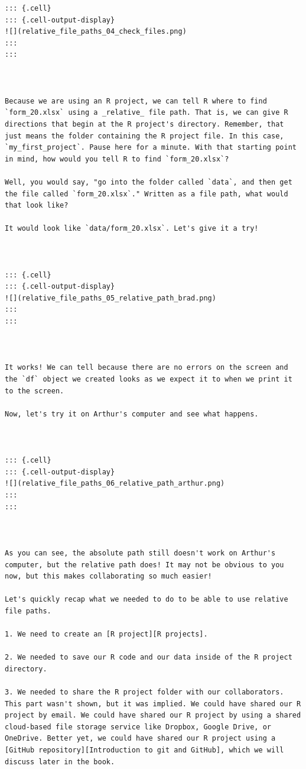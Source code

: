 \documentclass[
  letterpaper,
  DIV=11,
  numbers=noendperiod]{scrreprt}
\begin{document}
\begin{verbatim}
::: {.cell}
::: {.cell-output-display}
![](relative_file_paths_04_check_files.png)
:::
:::



Because we are using an R project, we can tell R where to find `form_20.xlsx` using a _relative_ file path. That is, we can give R directions that begin at the R project's directory. Remember, that just means the folder containing the R project file. In this case, `my_first_project`. Pause here for a minute. With that starting point in mind, how would you tell R to find `form_20.xlsx`?

Well, you would say, "go into the folder called `data`, and then get the file called `form_20.xlsx`." Written as a file path, what would that look like?

It would look like `data/form_20.xlsx`. Let's give it a try!



::: {.cell}
::: {.cell-output-display}
![](relative_file_paths_05_relative_path_brad.png)
:::
:::



It works! We can tell because there are no errors on the screen and the `df` object we created looks as we expect it to when we print it to the screen.

Now, let's try it on Arthur's computer and see what happens.



::: {.cell}
::: {.cell-output-display}
![](relative_file_paths_06_relative_path_arthur.png)
:::
:::



As you can see, the absolute path still doesn't work on Arthur's computer, but the relative path does! It may not be obvious to you now, but this makes collaborating so much easier!

Let's quickly recap what we needed to do to be able to use relative file paths. 

1. We need to create an [R project][R projects].

2. We needed to save our R code and our data inside of the R project directory. 

3. We needed to share the R project folder with our collaborators. This part wasn't shown, but it was implied. We could have shared our R project by email. We could have shared our R project by using a shared cloud-based file storage service like Dropbox, Google Drive, or OneDrive. Better yet, we could have shared our R project using a [GitHub repository][Introduction to git and GitHub], which we will discuss later in the book. 


\end{verbatim}
\end{document}
